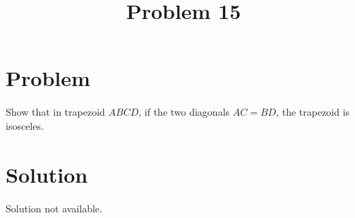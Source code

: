 \documentclass{article}
\title{Problem 15}
\date{}
\begin{document}
\maketitle

\section*{Problem}
Show that in trapezoid \(A B C D\), if the two diagonals \(A C=B D\), the trapezoid is isosceles.

\section*{Solution}
Solution not available.
\end{document}
